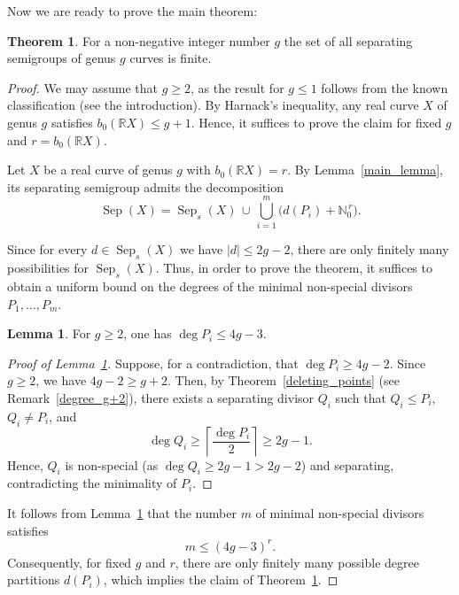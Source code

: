 \documentclass[x11names,oneside,11pt]{amsart}
\theoremstyle{definition}
\newtheorem{theorem}{Theorem}
\newtheorem{lemma}{Lemma}
\theoremstyle{remark}
\DeclareMathOperator{\Sep}{Sep}
\newcommand{\N}{\mathbb{N}}
\newcommand{\R}{\mathbb{R}}
\begin{document}
  Now we are ready to prove the main theorem: 

  \begin{theorem}\label{main_thm}
    For a non-negative integer number $g$ the set of all separating semigroups of genus $g$ curves is finite. 
  \end{theorem}
  \begin{proof} 
    We may assume that $g \geqslant 2$, as the result for $g \leqslant 1$ follows from the known classification (see the introduction). By Harnack's inequality, any real curve $X$ of genus $g$ satisfies $b_0(\R X) \leqslant g + 1$.  Hence, it suffices to prove the claim for fixed $g$ and $r = b_0(\R X)$.

    Let $X$ be a real curve of genus $g$ with $b_0(\R X) = r$.  By Lemma~\ref{main_lemma}, its separating semigroup admits the decomposition
    \[
      \Sep(X) = \Sep_s(X) \,\cup\, \bigcup_{i=1}^{m} \bigl( d(P_i) + \N_0^{\,r} \bigr).
    \]

    Since for every $d \in \Sep_s(X)$ we have $|d| \leqslant 2g - 2$, there are only finitely many possibilities for $\Sep_s(X)$. Thus, in order to prove the theorem, it suffices to obtain a uniform bound on the degrees of the minimal non-special divisors $P_1, \ldots, P_m$.

    \begin{lemma}\label{4g-3_lemma}
    For $g \geqslant 2$, one has $\deg P_i \leqslant 4g - 3$.
    \end{lemma}

    \begin{proof}[Proof of Lemma~\ref{4g-3_lemma}]
    Suppose, for a contradiction, that $\deg P_i \geqslant 4g - 2$. 
    Since $g \geqslant 2$, we have $4g - 2 \geqslant g + 2$. 
    Then, by Theorem~\ref{deleting_points} (see Remark~\ref{degree_g+2}), there exists a separating divisor $Q_i$ such that $Q_i \leqslant P_i$, $Q_i \ne P_i$, and
    \[
      \deg Q_i \geqslant \left\lceil \frac{\deg P_i}{2} \right\rceil \geqslant 2g - 1.
    \]
    Hence, $Q_i$ is non-special (as $\deg Q_i \geqslant 2g - 1 > 2g - 2$) and separating, contradicting the minimality of $P_i$.
    \end{proof}

    It follows from Lemma~\ref{4g-3_lemma} that the number $m$ of minimal non-special divisors satisfies 
    \[m \leqslant (4g - 3)^r.\]
      Consequently, for fixed $g$ and $r$, there are only finitely many possible degree partitions $d(P_i)$, which implies the claim of Theorem~\ref{main_thm}.

    \end{proof}
\end{document}
